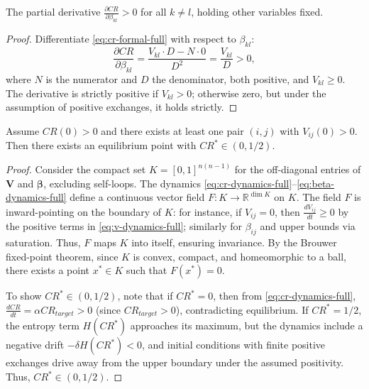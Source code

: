 \begin{lemma}
	\label{lem:monotonicity-beta}
	The partial derivative \(\frac{\partial CR}{\partial \beta_{kl}} > 0\) for all \(k \neq l\), holding other variables fixed.
\end{lemma}

\begin{proof}
	Differentiate \eqref{eq:cr-formal-full} with respect to \(\beta_{kl}\):
	\[
	\frac{\partial CR}{\partial \beta_{kl}} = \frac{V_{kl} \cdot D - N \cdot 0}{D^2} = \frac{V_{kl}}{D} > 0,
	\]
	where \(N\) is the numerator and \(D\) the denominator, both positive, and \(V_{kl} \geq 0\). The derivative is strictly positive if \(V_{kl} > 0\); otherwise zero, but under the assumption of positive exchanges, it holds strictly.
\end{proof}

\begin{proposition}
	\label{prop:existence-equilibrium}
	Assume \(CR(0) > 0\) and there exists at least one pair \((i,j)\) with \(V_{ij}(0) > 0\). Then there exists an equilibrium point with \(CR^* \in (0,1/2)\).
\end{proposition}

\begin{proof}
	Consider the compact set \(K = [0,1]^{n(n-1)}\) for the off-diagonal entries of \(\mathbf{V}\) and \(\boldsymbol{\beta}\), excluding self-loops. The dynamics \eqref{eq:cr-dynamics-full}--\eqref{eq:beta-dynamics-full} define a continuous vector field \(F: K \to \mathbb{R}^{\dim K}\) on \(K\). The field \(F\) is inward-pointing on the boundary of \(K\): for instance, if \(V_{ij} = 0\), then \(\frac{dV_{ij}}{dt} \geq 0\) by the positive terms in \eqref{eq:v-dynamics-full}; similarly for \(\beta_{ij}\) and upper bounds via saturation. Thus, \(F\) maps \(K\) into itself, ensuring invariance. By the Brouwer fixed-point theorem, since \(K\) is convex, compact, and homeomorphic to a ball, there exists a point \(x^* \in K\) such that \(F(x^*) = 0\).
	
	To show \(CR^* \in (0,1/2)\), note that if \(CR^* = 0\), then from \eqref{eq:cr-dynamics-full}, \(\frac{dCR}{dt} = \alpha CR_{target} > 0\) (since \(CR_{target} > 0\)), contradicting equilibrium. If \(CR^* = 1/2\), the entropy term \(H(CR^*)\) approaches its maximum, but the dynamics include a negative drift \(-\delta H(CR^*) < 0\), and initial conditions with finite positive exchanges drive away from the upper boundary under the assumed positivity. Thus, \(CR^* \in (0,1/2)\).
\end{proof}

